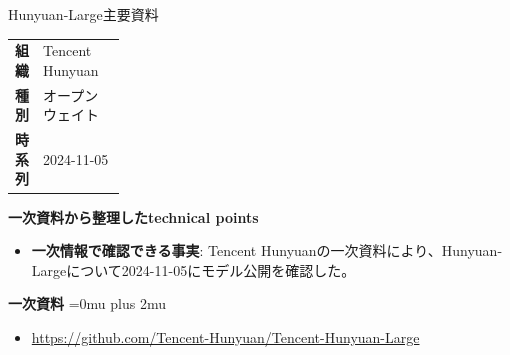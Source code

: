 \begin{technicalnote}{Hunyuan-Large}{主要資料}
\begingroup
\begin{tabularx}{\linewidth}{@{}>{\bfseries}p{0.22\linewidth}X@{}}
組織 & Tencent Hunyuan \\
種別 & オープンウェイト \\
時系列 & 2024-11-05 \\
\end{tabularx}
\smallskip
{\bfseries 一次資料から整理したtechnical points}
\begin{itemize}[leftmargin=1.5em,itemsep=0.35em]
\item \textbf{一次情報で確認できる事実}: Tencent Hunyuanの一次資料により、Hunyuan-Largeについて2024-11-05にモデル公開を確認した。
\end{itemize}
\begin{minipage}{\linewidth}
\begin{samepage}
{\bfseries 一次資料}
\begingroup\sloppy
\Urlmuskip=0mu plus 2mu\relax
\begin{itemize}[leftmargin=1.5em,itemsep=0.25em]
\item {\scriptsize\url{https://github.com/Tencent-Hunyuan/Tencent-Hunyuan-Large}}
\end{itemize}
\endgroup
\end{samepage}
\end{minipage}
\endgroup
\end{technicalnote}
\medskip

